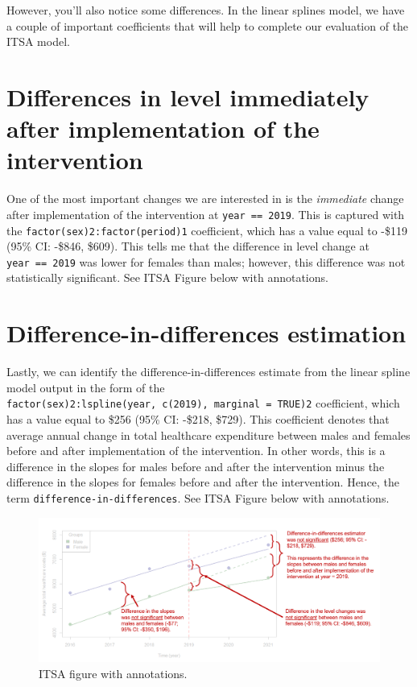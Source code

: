 \documentclass[
]{book}
\begin{document}
However, you'll also notice some differences. In the linear splines model, we have a couple of important coefficients that will help to complete our evaluation of the ITSA model.

\hypertarget{differences-in-level-immediately-after-implementation-of-the-intervention}{%
\section{Differences in level immediately after implementation of the intervention}\label{differences-in-level-immediately-after-implementation-of-the-intervention}}

One of the most important changes we are interested in is the \emph{immediate} change after implementation of the intervention at \texttt{year\ ==\ 2019}. This is captured with the \texttt{factor(sex)2:factor(period)1} coefficient, which has a value equal to -\$119 (95\% CI: -\$846, \$609). This tells me that the difference in level change at \texttt{year\ ==\ 2019} was lower for females than males; however, this difference was not statistically significant. See ITSA Figure below with annotations.

\hypertarget{difference-in-differences-estimation}{%
\section{Difference-in-differences estimation}\label{difference-in-differences-estimation}}

Lastly, we can identify the difference-in-differences estimate from the linear spline model output in the form of the \texttt{factor(sex)2:lspline(year,\ c(2019),\ marginal\ =\ TRUE)2} coefficient, which has a value equal to \$256 (95\% CI: -\$218, \$729). This coefficient denotes that average annual change in total healthcare expenditure between males and females before and after implementation of the intervention. In other words, this is a difference in the slopes for males before and after the intervention minus the difference in the slopes for females before and after the intervention. Hence, the term \texttt{difference-in-differences}. See ITSA Figure below with annotations.

\begin{figure}
\includegraphics[width=1\linewidth]{Figure 6_3} \caption{ITSA figure with annotations.}\label{fig:unnamed-chunk-94}
\end{figure}
\end{document}
